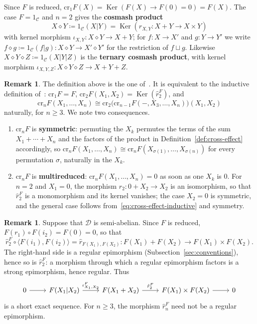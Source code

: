 \documentclass[reqno,a4paper]{amsart}
\theoremstyle{plain}
\theoremstyle{definition}
\newtheorem{remark}[subsection]{Remark}
\newcommand{\defn}{\textbf}
\newcommand{\DefEq}{\coloneq}
\newcommand{\C}{\ensuremath{\mathcal{C}}}
\newcommand{\D}{\ensuremath{\mathcal{D}}}
\newcommand{\cre}{\ensuremath{\mathrm{cr}}}
\DeclareMathOperator{\Ker}{Ker}
\newcommand{\cosmash}{\ensuremath{\diamond}}
\newcommand{\cosum}{\ensuremath{\sqcup}}                   %
\newcommand{\cm}[2]{\ensuremath{\hat{r}_{#1,#2}}}          %
\newcommand{\cmF}[2]{\ensuremath{\hat{r}^{#1}_{#2}}}       %
\begin{document}
Since \(F\) is reduced, \(\cre_{1}F(X)=\Ker(F(X)\to F(0)=0)=F(X)\). The case \(F=1_{\C}\) and \(n=2\) gives the \defn{cosmash product}~\cite{CJ03}
\[
  X\cosmash Y\DefEq 1_{\C}(X|Y)=\Ker(\cm{X}{Y}\colon X+Y\to X\times Y)
\]
with kernel morphism \(\iota_{X,Y}\colon X\cosmash Y\to X+Y\); for \(f\colon X\to X'\) and \(g\colon Y\to Y'\) we write \(f\cosmash g\DefEq 1_{\C}(f|g)\colon X\cosmash Y\to X'\cosmash Y'\) for the restriction of \(f\cosum g\). Likewise \(X\cosmash Y\cosmash Z\DefEq 1_{\C}(X|Y|Z)\) is the \defn{ternary cosmash product}, with kernel morphism \(\iota_{X,Y,Z}\colon X\cosmash Y\cosmash Z\to X+Y+Z\).

\begin{remark}\label{rem:cross-effect-properties}
  The definition above is the one of~\cite[Remark~2.8]{HVdL}. It is equivalent to the inductive definition of~\cite[Definition~1.2]{Hartl-Vespa}: \(\cre_{1}F=F\), \(\cre_{2}F(X_{1},X_{2})=\Ker(\cmF{F}{2})\), and
  \begin{equation}\label{eq:cross-effect-inductive}
    \cre_{n}F(X_{1},\dots,X_{n})\cong\cre_{2}\bigl(\cre_{n-1}F(-,X_{3},\dots,X_{n})\bigr)(X_{1},X_{2})
  \end{equation}
  naturally, for \(n\geq 3\). We note two consequences.
  \begin{enumerate}
    \item \(\cre_{n}F\) is \defn{symmetric}: permuting the \(X_{k}\) permutes the terms of the sum \(X_{1}+\cdots+X_{n}\) and the factors of the product in Definition~\ref{def:cross-effect} accordingly, so \(\cre_{n}F(X_{1},\dots,X_{n})\cong\cre_{n}F(X_{\sigma(1)},\dots,X_{\sigma(n)})\) for every permutation \(\sigma\), naturally in the \(X_{k}\).
    \item \(\cre_{n}F\) is \defn{multireduced}: \(\cre_{n}F(X_{1},\dots,X_{n})=0\) as soon as one \(X_{k}\) is \(0\). For \(n=2\) and \(X_{1}=0\), the morphism \(r_{2}\colon 0+X_{2}\to X_{2}\) is an isomorphism, so that \(\cmF{F}{2}\) is a monomorphism and its kernel vanishes; the case \(X_{2}=0\) is symmetric, and the general case follows from~\eqref{eq:cross-effect-inductive} and symmetry.
  \end{enumerate}
\end{remark}

\begin{remark}\label{rem:r2-regular-epi}
  Suppose that \(\D\) is semi-abelian. Since \(F\) is reduced, \(F(r_{1})\circ F(i_{2})=F(0)=0\), so that
  \[
    \cmF{F}{2}\circ\langle F(i_{1}),F(i_{2})\rangle=\cm{F(X_{1})}{F(X_{2})}\colon F(X_{1})+F(X_{2})\to F(X_{1})\times F(X_{2})\text{.}
  \]
  The right-hand side is a regular epimorphism (Subsection~\ref{sec:conventions}), hence so is \(\cmF{F}{2}\): a morphism through which a regular epimorphism factors is a strong epimorphism, hence regular. Thus
  \[
    \begin{tikzcd}
      0 \arrow[r] & F(X_{1}|X_{2}) \arrow[r, "\iota^{F}_{X_{1},X_{2}}"] & F(X_{1}+X_{2}) \arrow[r, "\cmF{F}{2}"] & F(X_{1})\times F(X_{2}) \arrow[r] & 0
    \end{tikzcd}
  \]
  is a short exact sequence. For \(n\geq 3\), the morphism \(\cmF{F}{n}\) need not be a regular epimorphism.
\end{remark}
\end{document}
